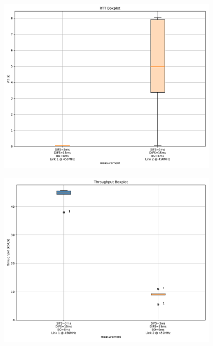 \documentclass{article}
\begin{document}
\begin{figure}
	\includegraphics[width=\textwidth]{rb_dual/link_1_2/boxplot/rtt_boxplot}
\end{figure}

\begin{figure}
	\includegraphics[width=\textwidth]{rb_dual/link_1_2/boxplot/throughput_boxplot}
\end{figure}

\end{document}
